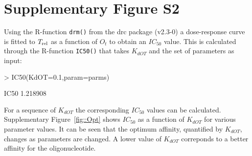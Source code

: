 \documentclass[a4paper,11pt]{article}
\newcommand{\Trel}{T_{\rm{rel}}}
\begin{document}
\section{Supplementary Figure S2}
Using the R-function \texttt{drm()} from the drc package (v2.3-0) a dose-response curve is fitted to $\Trel$ as a function of $O_t$ to obtain an $IC_{50}$ value. This is calculated through the R-function \texttt{IC50()} that takes $K_{dOT}$ and the set of parameters as input:
\begin{Schunk}
\begin{Sinput}
> IC50(KdOT=0.1,param=parms)
\end{Sinput}
\begin{Soutput}
    IC50 
1.218908 
\end{Soutput}
\end{Schunk}
For a sequence of $K_{dOT}$ the corresponding $IC_{50}$ values can be calculated. Supplementary Figure~\ref{fig::Opt} shows $IC_{50}$ as a function of $K_{dOT}$ for various parameter values. It can be seen that the optimum affinity, quantified by $K_{dOT}$, changes as parameters are changed. A lower value of $K_{dOT}$ correponds to a better affinity for the oligonucleotide.
%  
% 
%  
% 
\end{document}
